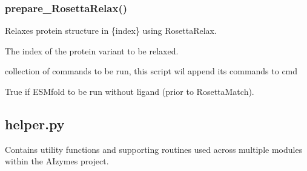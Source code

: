 \documentclass[10pt]{extarticle}
\begin{document}
\subsubsection{prepare\_RosettaRelax()}
Relaxes protein structure in \{index\} using RosettaRelax.

\par\vspace*{0.5\baselineskip}
{
\begin{description}[noitemsep,topsep=0pt,parsep=0pt,labelwidth=5cm,leftmargin=!,labelindent=0pt,labelsep=0.2cm,itemsep=0pt]
\item[\textcolor{mpgAccentBlue!75!white}{index (str)\dotfill}] The index of the protein variant to be relaxed.
\item[\textcolor{mpgAccentBlue!75!white}{cmd (str)\dotfill}] collection of commands to be run, this script wil append its commands to cmd
\end{description}
}
\par\vspace*{0.5\baselineskip}
{
\begin{description}[noitemsep,topsep=0pt,parsep=0pt,labelwidth=5cm,leftmargin=!,labelindent=0pt,labelsep=0.2cm,itemsep=0pt]
\item[\textcolor{mpgAccentBlue!75!white}{PreMatchRelax (bool)\dotfill}] True if ESMfold to be run without ligand (prior to RosettaMatch).
\end{description}
}
\subsection{helper.py}
Contains utility functions and supporting routines used across multiple modules
within the AIzymes project.
\end{document}
